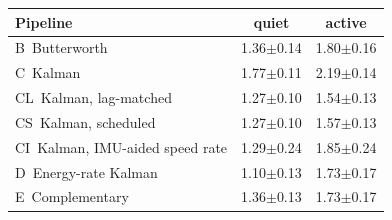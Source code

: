 \begin{tabular}{@{}lcc@{}}
\toprule
Pipeline & quiet & active \\
\midrule
B~Butterworth & 1.36$\pm$0.14 & 1.80$\pm$0.16 \\
C~Kalman & 1.77$\pm$0.11 & 2.19$\pm$0.14 \\
CL~Kalman, lag-matched & 1.27$\pm$0.10 & 1.54$\pm$0.13 \\
CS~Kalman, scheduled & 1.27$\pm$0.10 & 1.57$\pm$0.13 \\
CI~Kalman, IMU-aided speed rate & 1.29$\pm$0.24 & 1.85$\pm$0.24 \\
D~Energy-rate Kalman & 1.10$\pm$0.13 & 1.73$\pm$0.17 \\
E~Complementary & 1.36$\pm$0.13 & 1.73$\pm$0.17 \\
\bottomrule
\end{tabular}
